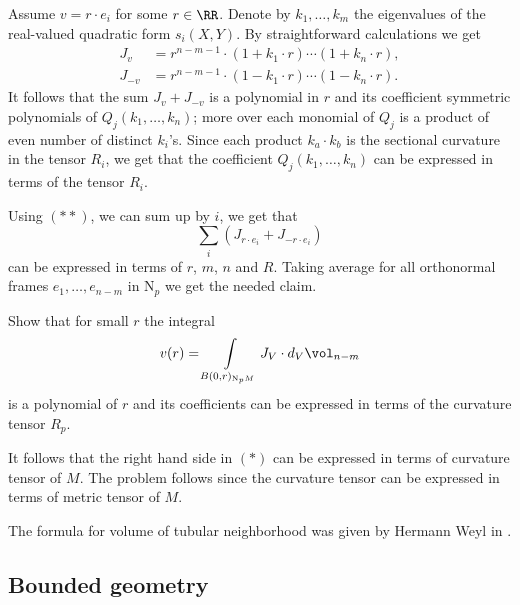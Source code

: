 Assume $v=r\cdot e_i$ for some $r\in \RR$.
Denote by $k_{1},\dots, k_{m}$ the eigenvalues of the real-valued quadratic form  $s_i(X,Y)$.
By straightforward calculations we get 
\begin{align*}
J_{v}&=r^{n-m-1}\cdot(1+k_1\cdot r)\cdots(1+k_n\cdot r),
\\
J_{-v}&=r^{n-m-1}\cdot(1-k_1\cdot r)\cdots(1-k_n\cdot r).
\end{align*}
It follows that the sum $J_{v}+J_{-v}$ is a polynomial in $r$ and its coefficient 
symmetric polynomials of $Q_j(k_1,\dots, k_n)$; more over each monomial of $Q_j$ is a product of even number of distinct $k_i$'s.
Since each product $k_a\cdot k_b$ is the sectional curvature in the tensor $R_i$,
we get that the coefficient $Q_j(k_1,\dots, k_n)$ can be expressed in terms of the tensor $R_i$.

Using $({*}{*})$, we can sum up by $i$, we get that
\[\sum_i(J_{r\cdot e_i}+J_{-r\cdot e_i})\]
can be expressed in terms of $r$, $m$, $n$ and $R$.
Taking average for all orthonormal frames $e_1,\dots, e_{n-m}$ in $\mathrm{N}_p$
we get the needed claim.





Show that for small $r$ the integral
\[v(r)=\int\limits_{B(0,r)_{\mathrm{N}_pM}}J_V\cdot d_V\vol_{n-m}\]
is a polynomial 
of $r$ and its coefficients can be expressed in terms of the curvature tensor $R_p$.

It follows that the right hand side in $({*})$ can be expressed in terms of curvature tensor of $M$.
The problem follows since the curvature tensor can be expressed in terms of metric tensor of $M$.\qeds


The formula for volume of tubular neighborhood 
was given by Hermann Weyl in \cite{weyl}.
























\subsection*{Bounded geometry}

